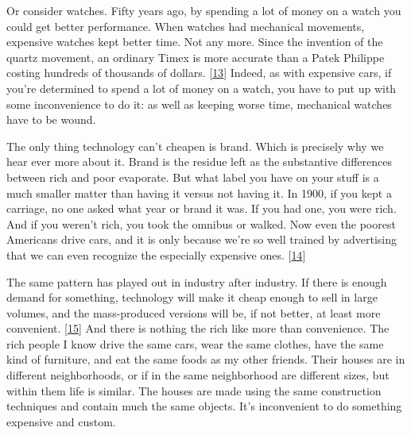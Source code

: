 Or
                  consider watches. Fifty years ago, by spending a lot of money
                  on a watch you could get better performance. When watches had
                  mechanical movements, expensive watches kept better time. Not
                  any more. Since the invention of the quartz movement, an
                  ordinary Timex is more accurate than a Patek Philippe costing
                  hundreds of thousands of dollars.
                  [\href{\#f13n}{13}]
                  Indeed, as with expensive cars, if you're determined to spend
                  a lot of money on a watch, you have to put up with some
                  inconvenience to do it: as well as keeping worse time,
                  mechanical watches have to be wound.

The only thing
                  technology can't cheapen is brand. Which is precisely why we
                  hear ever more about it. Brand is the residue left as the
                  substantive differences between rich and poor evaporate. But
                  what label you have on your stuff is a much smaller matter
                  than having it versus not having it. In 1900, if you kept a
                  carriage, no one asked what year or brand it was. If you had
                  one, you were rich. And if you weren't rich, you took the
                  omnibus or walked. Now even the poorest Americans drive cars,
                  and it is only because we're so well trained by advertising
                  that we can even recognize the especially expensive ones.
                  [\href{\#f14n}{14}]

The same pattern has played out in industry after
                  industry. If there is enough demand for something, technology
                  will make it cheap enough to sell in large volumes, and the
                  mass-produced versions will be, if not better, at least more
                  convenient.
                  [\href{\#f15n}{15}]
                  And there is nothing the rich like more than convenience. The
                  rich people I know drive the same cars, wear the same clothes,
                  have the same kind of furniture, and eat the same foods as my
                  other friends. Their houses are in different neighborhoods, or
                  if in the same neighborhood are different sizes, but within
                  them life is similar. The houses are made using the same
                  construction techniques and contain much the same objects.
                  It's inconvenient to do something expensive and custom.

